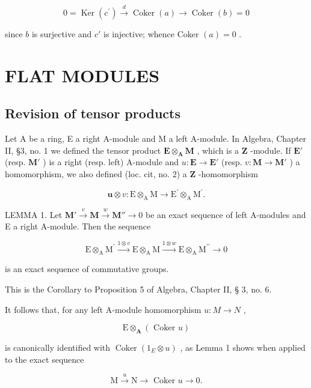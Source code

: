 \[
0 = \operatorname{Ker} (c ^ {\prime}) \xrightarrow {d} \operatorname{Coker} (a) \longrightarrow \operatorname{Coker} (b) = 0
\]

since \(b\) is surjective and \(c'\) is injective; whence Coker \((a) = 0\) .

\section{FLAT MODULES}

\subsection{Revision of tensor products}

Let A be a ring, E a right A-module and M a left A-module. In Algebra, Chapter II, §3, no. 1 we defined the tensor product \(\mathbf{E} \otimes_{\mathbf{A}} \mathbf{M}\) , which is a \(\mathbf{Z}\) -module. If \(\mathbf{E}'\) (resp. \(\mathbf{M}'\) ) is a right (resp. left) A-module and \(u: \mathbf{E} \to \mathbf{E}'\) (resp. \(v: \mathbf{M} \to \mathbf{M}'\) ) a homomorphism, we also defined (loc. cit, no. 2) a \(\mathbf{Z}\) -homomorphism

\[
\boldsymbol {u} \otimes v: \mathrm{E} \otimes_ {\mathrm{A}} \mathrm{M} \rightarrow \mathrm{E} ^ {\prime} \otimes_ {\mathrm{A}} \mathrm{M} ^ {\prime}.
\]

LEMMA 1. Let \(\mathbf{M}' \xrightarrow{v} \mathbf{M} \xrightarrow{w} \mathbf{M}'' \to 0\) be an exact sequence of left A-modules and E a right A-module. Then the sequence

\[
\mathrm{E} \otimes_ {\mathrm{A}} \mathrm{M} ^ {\prime} \xrightarrow {1 \otimes v} \mathrm{E} \otimes_ {\mathrm{A}} \mathrm{M} \xrightarrow {1 \otimes w} \mathrm{E} \otimes_ {\mathrm{A}} \mathrm{M} ^ {\prime \prime} \longrightarrow 0
\]

is an exact sequence of commutative groups.

This is the Corollary to Proposition 5 of Algebra, Chapter II, § 3, no. 6.

It follows that, for any left A-module homomorphism \(u: M \rightarrow N\) ,

\[
\mathrm{E} \otimes_ {\mathbf {A}} (\text { Coker } u)
\]

is canonically identified with \(\operatorname{Coker}(1_{E} \otimes u)\) , as Lemma 1 shows when applied to the exact sequence

\[
\mathrm{M} \xrightarrow {u} \mathrm{N} \longrightarrow \text { Coker } u \longrightarrow 0.
\]

